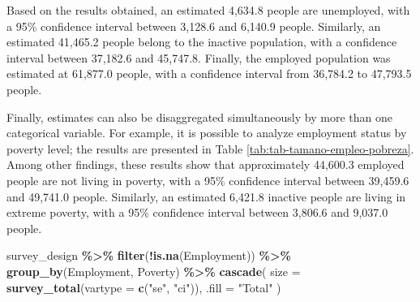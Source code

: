 \documentclass[
  english,
  12pt,
]{book}
\newenvironment{Shaded}{\begin{snugshade}}{\end{snugshade}}
\newcommand{\AttributeTok}[1]{\textcolor[rgb]{0.13,0.29,0.53}{#1}}
\newcommand{\FunctionTok}[1]{\textcolor[rgb]{0.13,0.29,0.53}{\textbf{#1}}}
\newcommand{\NormalTok}[1]{#1}
\newcommand{\SpecialCharTok}[1]{\textcolor[rgb]{0.81,0.36,0.00}{\textbf{#1}}}
\newcommand{\StringTok}[1]{\textcolor[rgb]{0.31,0.60,0.02}{#1}}
\begin{document}
Based on the results obtained, an estimated 4,634.8 people are unemployed, with a 95\% confidence interval between 3,128.6 and 6,140.9 people. Similarly, an estimated 41,465.2 people belong to the inactive population, with a confidence interval between 37,182.6 and 45,747.8. Finally, the employed population was estimated at 61,877.0 people, with a confidence interval from 36,784.2 to 47,793.5 people.

Finally, estimates can also be disaggregated simultaneously by more than one categorical variable. For example, it is possible to analyze employment status by poverty level; the results are presented in Table \ref{tab:tab-tamano-empleo-pobreza}. Among other findings, these results show that approximately 44,600.3 employed people are not living in poverty, with a 95\% confidence interval between 39,459.6 and 49,741.0 people. Similarly, an estimated 6,421.8 inactive people are living in extreme poverty, with a 95\% confidence interval between 3,806.6 and 9,037.0 people.

\begin{Shaded}
\begin{Highlighting}[]
\NormalTok{survey\_design }\SpecialCharTok{\%\textgreater{}\%}
  \FunctionTok{filter}\NormalTok{(}\SpecialCharTok{!}\FunctionTok{is.na}\NormalTok{(Employment)) }\SpecialCharTok{\%\textgreater{}\%}
  \FunctionTok{group\_by}\NormalTok{(Employment, Poverty) }\SpecialCharTok{\%\textgreater{}\%}
  \FunctionTok{cascade}\NormalTok{(}
    \AttributeTok{size =} \FunctionTok{survey\_total}\NormalTok{(}\AttributeTok{vartype =} \FunctionTok{c}\NormalTok{(}\StringTok{"se"}\NormalTok{, }\StringTok{"ci"}\NormalTok{)),}
    \AttributeTok{.fill =} \StringTok{"Total"}
\NormalTok{  )}
\end{Highlighting}
\end{Shaded}
\end{document}
